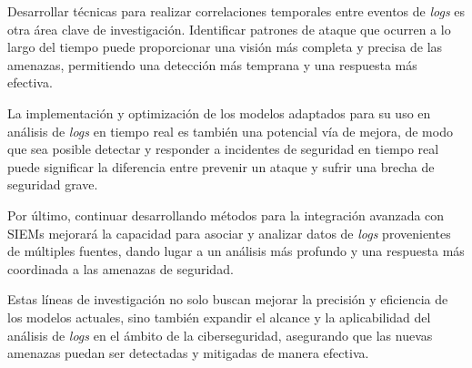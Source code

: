 Desarrollar técnicas para realizar correlaciones temporales entre eventos de \textit{logs} es otra área clave de investigación. Identificar patrones de ataque que ocurren a lo largo del tiempo puede proporcionar una visión más completa y precisa de las amenazas, permitiendo una detección más temprana y una respuesta más efectiva.

La implementación y optimización de los modelos adaptados para su uso en análisis de \textit{logs} en tiempo real es también una potencial vía de mejora, de modo que sea posible detectar y responder a incidentes de seguridad en tiempo real puede significar la diferencia entre prevenir un ataque y sufrir una brecha de seguridad grave.

Por último, continuar desarrollando métodos para la integración avanzada con \gls{SIEM}s mejorará la capacidad para asociar y analizar datos de \textit{logs} provenientes de múltiples fuentes, dando lugar a un análisis más profundo y una respuesta más coordinada a las amenazas de seguridad.

Estas líneas de investigación no solo buscan mejorar la precisión y eficiencia de los modelos actuales, sino también expandir el alcance y la aplicabilidad del análisis de \textit{logs} en el ámbito de la ciberseguridad, asegurando que las nuevas amenazas puedan ser detectadas y mitigadas de manera efectiva.
